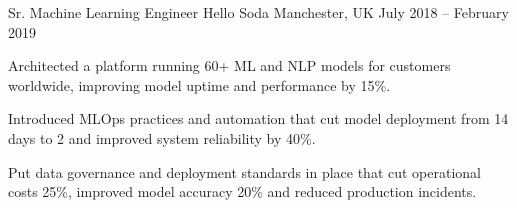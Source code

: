\cventry
{Sr. Machine Learning Engineer}
{Hello Soda}
{Manchester, UK}
{July 2018 -- February 2019}
{
\begin{cvitems}
  \item {Architected a platform running 60+ ML and NLP models for customers worldwide, improving model uptime and performance by 15\%.}
  \item {Introduced MLOps practices and automation that cut model deployment from 14 days to 2 and improved system reliability by 40\%.}
  \item {Put data governance and deployment standards in place that cut operational costs 25\%, improved model accuracy 20\% and reduced production incidents.}
\end{cvitems}
}
